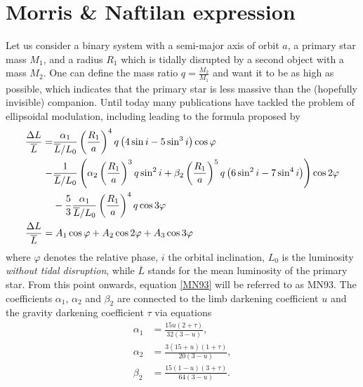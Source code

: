 \documentclass{pracalicmgr}
\begin{document}
\section{Morris \& Naftilan expression}
Let us consider a binary system with a semi-major axis of orbit $a$, a primary star mass $M_1$, and a radius $R_1$ which is tidally disrupted by a second object with a mass $M_2$.
One can define the mass ratio $q=\frac{M_2}{M_1}$ and want it to be as high as possible, which indicates that the primary star
is less massive than the (hopefully invisible) companion. 
Until today many publications have tackled the problem of ellipsoidal modulation, including \citet{kopal_close_1959} leading to the formula proposed by \citet{morris_equations_1993}
\begin{align}\label{MN93}
    \begin{split}
    \phantom{\frac{\Delta{L}}{\overline{L}}}
    &\begin{aligned}
        \mathllap{\frac{\Delta{L}}{\overline{L}}}  =& \frac{\alpha_1}{\overline{L}/L_0}\left(\frac{R_1}{a}\right)^4q\left(4\sin{i}-5\sin^3{i}\right)\cos{\varphi} \\
        -&\frac{1}{\overline{L}/L_0}\left(\alpha_2\left(\frac{R_1}{a}\right)^3q\sin^2{i}+\beta_2 
        \left(\frac{R_1}{a}\right)^5q\left(6\sin^2{i}-7\sin^4{i}\right)\right)\cos{2\varphi} \\
        &-\frac{5}{3}\frac{\alpha_1}{\overline{L}/L_0}\left(\frac{R_1}{a}\right)^4q\cos{3\varphi}
    \end{aligned}\\
    &\begin{aligned}
        \mathllap{\frac{\Delta{L}}{\overline{L}}}   &= A_1\cos{\varphi}+A_2\cos{2\varphi}+A_3\cos{3\varphi}
    \end{aligned}
    \end{split}
\end{align}
where $\varphi$ denotes the relative phase, $i$ the orbital inclination, $L_0$ is the luminosity {{\it without tidal disruption}},
while $\overline{L}$ stands for the mean luminosity of the primary star. From this point onwards, equation \ref{MN93} will be referred to as MN93.
The coefficients $\alpha_1$, $\alpha_2$ and
$\beta_2$ are connected to the limb darkening coefficient $u$ and the gravity darkening coefficient $\tau$ via equations
\begin{align}
    \alpha_1 &=\frac{15u(2+\tau)}{32(3-u)},\\
    \alpha_2 &=\frac{3(15+u)(1+\tau)}{20(3-u)},\\
    \beta_2 &=\frac{15(1-u)(3+\tau)}{64(3-u)}.
\end{align}
\end{document}
